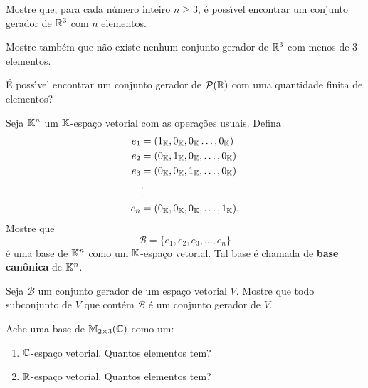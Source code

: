 \documentclass[12pt]{exam}
\begin{document}
\begin{exercicio}
  Mostre que, para cada n\'umero inteiro $n \ge 3$, \'e poss{\'\i}vel encontrar um conjunto gerador de $\mathbb{R}^3$ com $n$ elementos.
\end{exercicio}

\begin{exercicio}
  Mostre tamb\'em que n\~ao existe nenhum conjunto gerador de $\mathbb{R}^3$ com menos de $3$ elementos.
\end{exercicio}

\begin{exercicio}
  \'E poss{\'\i}vel encontrar um conjunto gerador de $\mathcal{P}(\mathbb{R})$ com uma quantidade finita de elementos?
\end{exercicio}

\begin{exercicio}
  Seja $\mathbb{K}^n$ um $\mathbb{K}$-espa\c{c}o vetorial com as opera\c{c}\~oes usuais. Defina
  \begin{align*}
    e_1 &= (1_{\mathbb{K}}, 0_{\mathbb{K}}, 0_{\mathbb{K}} \dots, 0_{\mathbb{K}})\\
    e_2 &= (0_{\mathbb{K}}, 1_{\mathbb{K}}, 0_{\mathbb{K}}, \dots, 0_{\mathbb{K}})\\
    e_3 &= (0_{\mathbb{K}}, 0_{\mathbb{K}}, 1_{\mathbb{K}}, \dots, 0_{\mathbb{K}})\\
    &\vdots\\
    e_n &= (0_{\mathbb{K}}, 0_{\mathbb{K}}, 0_{\mathbb{K}}, \dots, 1_{\mathbb{K}}).
  \end{align*}
  Mostre que
  \[
    \mathcal{B} = \{e_1, e_2, e_3, \dots, e_n\}
  \]
  \'e uma base de $\mathbb{K}^n$ como um $\mathbb{K}$-espa\c{c}o vetorial. Tal base \'e chamada de \textbf{base can\^onica} de $\mathbb{K}^n$.
\end{exercicio}

\begin{exercicio}
Seja $\mathcal{B}$ um conjunto gerador de um espa\c{c}o vetorial $V$. Mostre que todo subconjunto de $V$ que cont\'em $\mathcal{B}$ \'e um conjunto gerador de $V$.
\end{exercicio}

\begin{exercicio}
  Ache uma base de $\mathbb{M}_{2 \times 3}(\mathbb{C})$ como um:
  \begin{enumerate}[label={\alph*})]
     \item $\mathbb{C}$-espa\c{c}o vetorial. Quantos elementos tem?
     \item $\mathbb{R}$-espa\c{c}o vetorial. Quantos elementos tem?
   \end{enumerate}
\end{exercicio}
\end{document}
